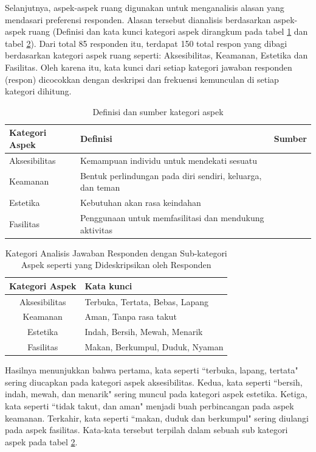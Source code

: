 \documentclass[11pt]{simartadv} %
\begin{document}
Selanjutnya, aspek-aspek ruang digunakan untuk menganalisis alasan yang mendasari preferensi responden.
Alasan tersebut dianalisis berdasarkan aspek-aspek ruang (Definisi dan kata kunci kategori aspek dirangkum pada tabel \ref{tab:defasp} dan tabel \ref{tab:katasp}). Dari total 85 responden itu, terdapat 150 total respon yang dibagi berdasarkan kategori aspek ruang seperti: Aksesibilitas, Keamanan, Estetika dan Fasilitas. Oleh karena itu, kata kunci dari setiap kategori jawaban responden (respon) dicocokkan dengan deskripsi dan frekuensi kemunculan di setiap kategori dihitung.

\begin{table}[htpb]
    \centering
    \caption{Definisi dan sumber kategori aspek}
    \label{tab:defasp}
    \begin{tabularx}{\textwidth}{p{2.2cm} p{} l}
        \toprule
        \textbf{Kategori Aspek} & \textbf{Definisi} & \textbf{Sumber}\\
\midrule
Aksesibilitas & Kemampuan individu untuk mendekati sesuatu  & \cite{larosa2018} \\
Keamanan & Bentuk perlindungan pada diri sendiri, keluarga, dan teman & \cite{carr1992} \\
Estetika & Kebutuhan akan rasa keindahan & \cite{hradilova2013} \\
Fasilitas & Penggunaan untuk memfasilitasi dan mendukung aktivitas  & \cite{carmona2021} \\
\bottomrule
    \end{tabularx}
\end{table}

\begin{table}[ht]
    \centering
    \caption{Kategori Analisis Jawaban Responden dengan Sub-kategori Aspek seperti yang Dideskripsikan oleh Responden}
    \label{tab:katasp}
    \begin{tabular}{c l}
        \toprule
        \textbf{Kategori Aspek} & \textbf{Kata kunci}\\
\midrule
Aksesibilitas & Terbuka, Tertata, Bebas, Lapang \\
Keamanan & Aman, Tanpa rasa takut\\
Estetika & Indah, Bersih, Mewah, Menarik \\
Fasilitas & Makan, Berkumpul, Duduk, Nyaman \\
\bottomrule
    \end{tabular}
\end{table}

Hasilnya menunjukkan bahwa pertama, kata seperti ``terbuka, lapang, tertata" sering diucapkan pada kategori aspek aksesibilitas. Kedua, kata seperti ``bersih, indah, mewah, dan menarik" sering muncul pada kategori aspek estetika. Ketiga, kata seperti ``tidak takut, dan aman" menjadi buah perbincangan pada aspek keamanan. Terkahir, kata seperti ``makan, duduk dan berkumpul" sering diulangi pada aspek fasilitas. Kata-kata tersebut terpilah dalam sebuah sub kategori aspek pada tabel \ref{tab:katasp}.
\end{document}
